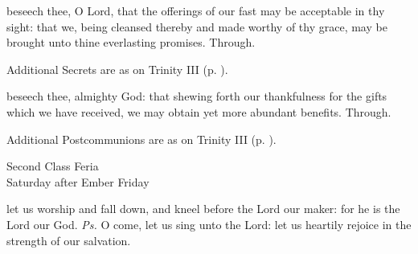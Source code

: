 \secret
{} beseech thee, O Lord, that the offerings of our fast may be acceptable in thy sight: that we, being cleansed thereby and made worthy of thy grace, may be brought unto thine everlasting promises. Through.
\begin{rubric}
    Additional Secrets are as on Trinity III (p. \pageref{TrinityIIISecret}).
\end{rubric}

\postcommunion
{} beseech thee, almighty God: that shewing forth our thankfulness for the gifts which we have received, we may obtain yet more abundant benefits. Through.
\begin{rubric}
    Additional Postcommunions are as on Trinity III (p. \pageref{TrinityIIIPostcommunion}).
\end{rubric}


\begin{inhead}
    {Second Class Feria\\
Saturday after Ember Friday}
\end{inhead}
\par\noindent
{}
\introit
{} let us worship and fall down, and kneel before the Lord our maker: for he is the Lord our God. \textit{Ps.} O come, let us sing unto the Lord: let us heartily rejoice in the strength of our salvation.


